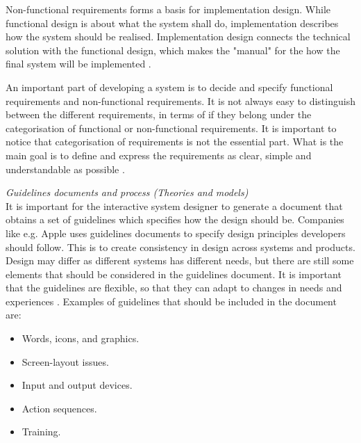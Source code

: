 Non-functional requirements forms a basis for implementation design. While functional design is about what the system shall do, implementation describes how the system should be realised. Implementation design connects the technical solution with the functional design, which makes the "manual" for the how the final system will be implemented \cite{systemutviklingDel1}.  

An important part of developing a system is to decide and specify functional requirements and non-functional requirements. It is not always easy to distinguish between the different requirements, in terms of if they belong under the categorisation of functional or non-functional requirements. It is important to notice that categorisation of requirements is not the essential part. What is the main goal is to define and express the requirements as clear, simple and understandable as possible \cite{systemutviklingDel1}.  

\emph{Guidelines documents and process (Theories and models)}\\
It is important for the interactive system designer to generate a document that obtains a set of guidelines which specifies how the design should be. Companies like e.g. Apple uses guidelines documents to specify design principles developers should follow. This is to create consistency in design across systems and products. Design may differ as different systems has different needs, but there are still some elements that should be considered in the guidelines document. It is important that the guidelines are flexible, so that they can adapt to changes in needs and experiences \cite{mmi}. Examples of guidelines that should be included in the document are:

\begin{itemize}
\renewcommand{\labelitemi}{$\bullet$}
\item Words, icons, and graphics.
\item Screen-layout issues.
\item Input and output devices.
\item Action sequences.
\item Training.
\end{itemize}

